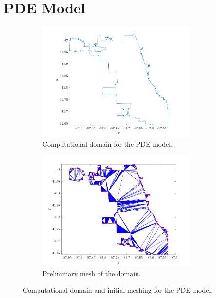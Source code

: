 \documentclass[11pt]{article}
\begin{document}
\section{PDE Model}
	\begin{figure}[h!]
		\centering
		\begin{subfigure}{0.5\textwidth}
			\centering
			\includegraphics[height=6cm]{domain}
			\caption{Computational domain for the PDE model.}
			\label{fig:domain}
		\end{subfigure}%
		\begin{subfigure}{0.5\textwidth}
			\centering
			\includegraphics[height=6cm]{mesh}
			\caption{Preliminary mesh of the domain.}
			\label{fig:mesh}
		\end{subfigure}
		\caption{Computational domain and initial meshing for the PDE model.}
		\label{fig:pde}
	\end{figure}
\end{document}
